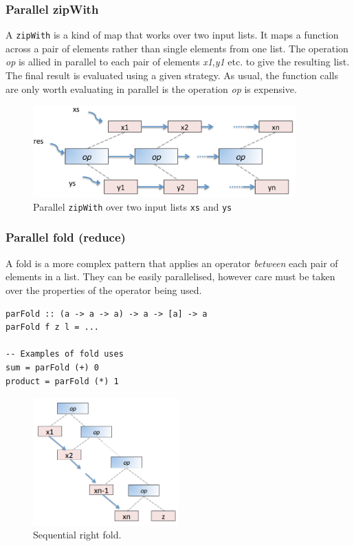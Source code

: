\documentclass[CS4204-Notes.tex]{subfiles}
\begin{document}
\subsubsection{Parallel zipWith}
A \texttt{zipWith} is a kind of map that works over two input lists. It maps a function across a pair of elements rather than single elements from one list. The operation \textit{op} is allied in parallel to each pair of elements \textit{x1},\textit{y1} etc. to give the resulting list. The final result is evaluated using a given strategy. As usual, the function calls are only worth evaluating in parallel is the operation \textit{op} is expensive. 
\begin{figure}[H]
\centering
\includegraphics[width=0.9\textwidth, keepaspectratio]{imgs/parallel-zipwith.png}
\caption{Parallel \texttt{zipWith} over two input lists \texttt{xs} and \texttt{ys}}
\end{figure}

\subsubsection{Parallel fold (reduce)}
A fold is a more complex pattern that applies an operator \textit{between} each pair of elements in a list. They can be easily parallelised, however care must be taken over the properties of the operator being used. 
\begin{lstlisting}[caption={Type signature of a parallel fold.}]
parFold :: (a -> a -> a) -> a -> [a] -> a
parFold f z l = ...

-- Examples of fold uses
sum = parFold (+) 0
product = parFold (*) 1
\end{lstlisting}

\begin{figure}[H]
\centering
\includegraphics[width=0.5\textwidth, keepaspectratio]{imgs/sequential-fold.png}
\caption{Sequential right fold.}
\end{figure}
\end{document}
